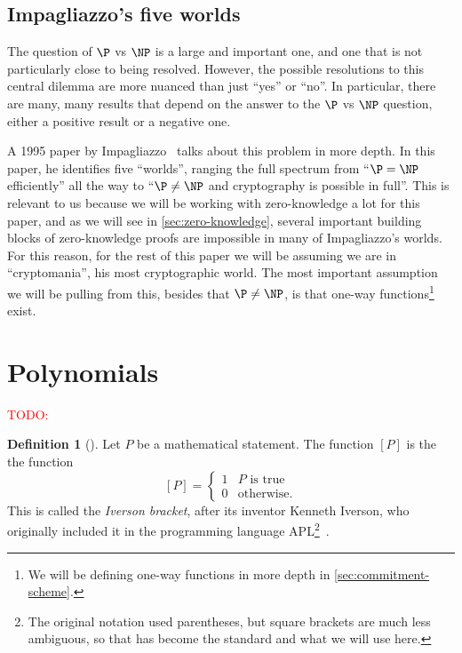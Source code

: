 \documentclass[english,12pt]{reedthesis}
\theoremstyle{plain}
\theoremstyle{definition}
\newtheorem{defn}[defn]{Definition}
\theoremstyle{remark}
\newcommand{\TODO}[1]{\textcolor{red}{TODO: #1}}
\begin{document}
\subsection{Impagliazzo's five worlds}\label{sec:five-worlds}

The question of $\P$ vs $\NP$ is a large and important one, and one that is not
particularly close to being resolved. However, the possible resolutions to this
central dilemma are more nuanced than just ``yes'' or ``no''. In particular,
there are many, many results that depend on the answer to the $\P$ vs $\NP$
question, either a positive result or a negative one.

A 1995 paper by Impagliazzo~\cite{Imp95} talks about this problem in more depth.
In this paper, he identifies five ``worlds'', ranging the full spectrum from
``$\P = \NP$ efficiently'' all the way to ``$\P \ne \NP$ and cryptography is
possible in full''. This is relevant to us because we will be working with
zero-knowledge a lot for this paper, and as we will see in
\cref{sec:zero-knowledge}, several important building blocks of zero-knowledge
proofs are impossible in many of Impagliazzo's worlds. For this reason, for the
rest of this paper we will be assuming we are in ``cryptomania'', his most
cryptographic world. The most important assumption we will be pulling from this,
besides that $\P \ne \NP$, is that one-way functions\footnote{We will be defining
  one-way functions in more depth in \cref{sec:commitment-scheme}.} exist.

\section{Polynomials}\label{sec:polynomial}

\TODO{}

\begin{defn}[{\cite{Knu92}}]\label{def:iverson-bracket}
  Let $P$ be a mathematical statement. The function $[P]$ is the the function
  \begin{equation}\label{eqn:iverson-bracket}
    [P] = \begin{cases}
      1 & P \text{ is true} \\
      0 & \text{otherwise.}
    \end{cases}
  \end{equation}
  This is called the \emph{Iverson bracket}, after its inventor Kenneth Iverson,
  who originally included it in the programming language APL\footnote{The
    original notation used parentheses, but square brackets are much less
    ambiguous, so that has become the standard and what we will use
    here.}~\cite[11]{APL}.
\end{defn}
\end{document}
